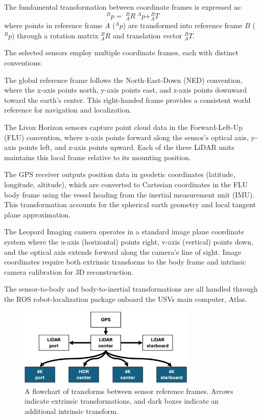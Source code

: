 \documentclass{erauthesis}
\begin{document}
The fundamental transformation between coordinate frames is expressed as:
\begin{equation}
^Bp =\; ^B_AR \; ^Ap + ^B_A T
\end{equation}
where points in reference frame $A$ ($^Ap$) are transformed into reference frame $B$ ($^Bp$) through a rotation matrix $^B_AR$ and translation vector $^B_A T$.

The selected sensors employ multiple coordinate frames, each with distinct conventions:

The global reference frame follows the North-East-Down (NED) convention, where the x-axis points north, y-axis points east, and z-axis points downward toward the earth's center. This right-handed frame provides a consistent world reference for navigation and localization.

The Livox Horizon sensors capture point cloud data in the Forward-Left-Up (FLU) convention, where x-axis points forward along the sensor's optical axis, y-axis points left, and z-axis points upward. Each of the three LiDAR units maintains this local frame relative to its mounting position.

The GPS receiver outputs position data in geodetic coordinates (latitude, longitude, altitude), which are converted to Cartesian coordinates in the FLU body frame using the vessel heading from the inertial measurement unit (IMU). This transformation accounts for the spherical earth geometry and local tangent plane approximation.

The Leopard Imaging camera operates in a standard image plane coordinate system where the u-axis (horizontal) points right, v-axis (vertical) points down, and the optical axis extends forward along the camera's line of sight. Image coordinates require both extrinsic transforms to the body frame and intrinsic camera calibration for 3D reconstruction.

The sensor-to-body and body-to-inertial transformations are all handled through the \Ac{ROS} robot-localization package onboard the \Acp{USV} main computer, Atlas.
\begin{figure}[htbp]
\centering
\includegraphics[width=0.75\textwidth]{Images/spatial_transforms.png}
\caption{A flowchart of transforms between sensor reference frames. Arrows indicate extrinsic transformations, and dark boxes indicate an additional intrinsic transform.}
\label{transform_diagm}
\end{figure}
\end{document}
